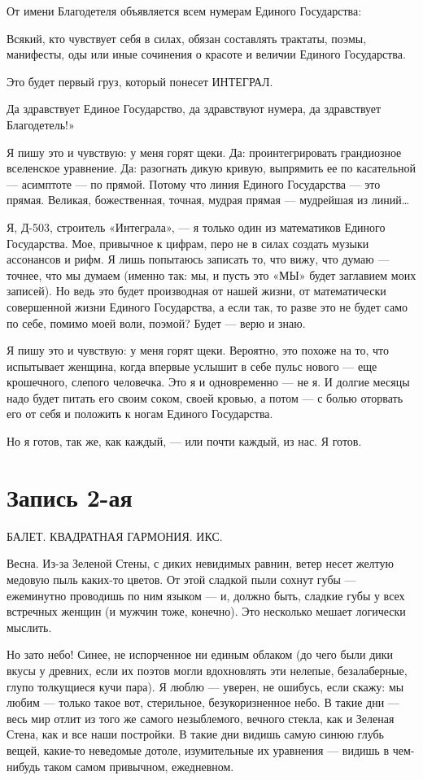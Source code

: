 \documentclass[11pt,openany]{book}
\newcommand{\bookchapterplain}[1]{%
  \clearpage\phantomsection\chapter*{#1}%
  \addcontentsline{toc}{chapter}{#1}\markboth{#1}{#1}\thispagestyle{plain}}
\begin{document}
От имени Благодетеля объявляется всем нумерам Единого Государства:

Всякий, кто чувствует себя в силах, обязан составлять трактаты, поэмы, манифесты, оды или иные сочинения о красоте и величии Единого Государства.

Это будет первый груз, который понесет ИНТЕГРАЛ.

Да здравствует Единое Государство, да здравствуют нумера, да здравствует Благодетель!»

Я пишу это и чувствую: у меня горят щеки. Да: проинтегрировать грандиозное вселенское уравнение. Да: разогнать дикую кривую, выпрямить ее по касательной --- асимптоте --- по прямой. Потому что линия Единого Государства --- это прямая. Великая, божественная, точная, мудрая прямая --- мудрейшая из линий\ldots{}

Я, Д-503, строитель «Интеграла», --- я только один из математиков Единого Государства. Мое, привычное к цифрам, перо не в силах создать музыки ассонансов и рифм. Я лишь попытаюсь записать то, что вижу, что думаю --- точнее, что мы думаем (именно так: мы, и пусть это «МЫ» будет заглавием моих записей). Но ведь это будет производная от нашей жизни, от математически совершенной жизни Единого Государства, а если так, то разве это не будет само по себе, помимо моей воли, поэмой? Будет --- верю и знаю.

Я пишу это и чувствую: у меня горят щеки. Вероятно, это похоже на то, что испытывает женщина, когда впервые услышит в себе пульс нового --- еще крошечного, слепого человечка. Это я и одновременно --- не я. И долгие месяцы надо будет питать его своим соком, своей кровью, а потом --- с болью оторвать его от себя и положить к ногам Единого Государства.

Но я готов, так же, как каждый, --- или почти каждый, из нас. Я готов.

\bookchapterplain{Запись 2-ая}

\begin{center}\textsc{БАЛЕТ. КВАДРАТНАЯ ГАРМОНИЯ. ИКС.}\end{center}

Весна. Из-за Зеленой Стены, с диких невидимых равнин, ветер несет желтую медовую пыль каких-то цветов. От этой сладкой пыли сохнут губы --- ежеминутно проводишь по ним языком --- и, должно быть, сладкие губы у всех встречных женщин (и мужчин тоже, конечно). Это несколько мешает логически мыслить.

Но зато небо! Синее, не испорченное ни единым облаком (до чего были дики вкусы у древних, если их поэтов могли вдохновлять эти нелепые, безалаберные, глупо толкущиеся кучи пара). Я люблю --- уверен, не ошибусь, если скажу: мы любим --- только такое вот, стерильное, безукоризненное небо. В такие дни --- весь мир отлит из того же самого незыблемого, вечного стекла, как и Зеленая Стена, как и все наши постройки. В такие дни видишь самую синюю глубь вещей, какие-то неведомые дотоле, изумительные их уравнения --- видишь в чем-нибудь таком самом привычном, ежедневном.
\end{document}
